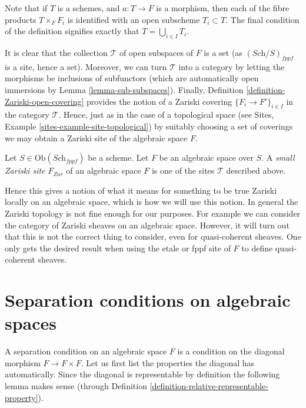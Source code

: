 \noindent
Note that if $T$ is a schemes,
and $a : T \to F$ is a morphism, then each of the fibre products
$T \times_F F_i$ is identified with an open subscheme
$T_i \subset T$. The final condition of the definition signifies
exactly that $T = \bigcup_{i \in I} T_i$.

\medskip\noindent
It is clear that the collection $\mathcal{T}$ of open subspaces of
$F$ is a set (as $(\textit{Sch}/S)_{fppf}$ is a site, hence a set).
Moreover, we can turn $\mathcal{T}$ into a category by letting the
morphisms be inclusions of subfunctors (which are automatically open
immersions by Lemma \ref{lemma-sub-subspaces}). Finally,
Definition \ref{definition-Zariski-open-covering}
provides the notion of a Zariski covering $\{F_i \to F'\}_{i \in I}$
in the category $\mathcal{T}$. Hence, just as in the case of a topological
space (see Sites, Example \ref{sites-example-site-topological})
by suitably choosing a set of coverings
we may obtain a Zariski site of the algebraic space $F$.

\begin{definition}
\label{definition-small-Zariski-site}
Let $S \in \text{Ob}(\textit{Sch}_{fppf})$ be a scheme.
Let $F$ be an algebraic space over $S$. A {\it small Zariski site $F_{Zar}$} of
an algebraic space $F$ is one of the sites $\mathcal{T}$ described above.
\end{definition}

\noindent
Hence this gives a notion of what it means for something to be true
Zariski locally on an algebraic space, which is how we will use this
notion. In general the Zariski topology is not fine enough for our
purposes. For example we can consider the category of Zariski sheaves
on an algebraic space. However, it will turn out that this is not the
correct thing to consider, even for quasi-coherent sheaves.
One only gets the desired result when using the etale or fppf site of
$F$ to define quasi-coherent sheaves.











\section{Separation conditions on algebraic spaces}
\label{section-separation}

\noindent
A separation condition on an algebraic space $F$ is a condition
on the diagonal morphism $F \to F \times F$. Let us first
list the properties the diagonal has automatically.
Since the diagonal is representable by definition the following lemma
makes sense (through
Definition \ref{definition-relative-representable-property}).

